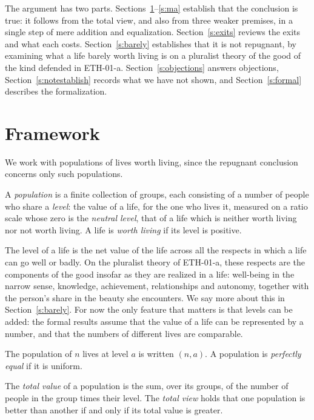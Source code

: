 \documentclass{situationist-preprint}
\begin{document}
The argument has two parts. Sections~\ref{s:framework}--\ref{s:ma} establish that the conclusion is true: it follows from the total view, and also from three weaker premises, in a single step of mere addition and equalization. Section~\ref{s:exits} reviews the exits and what each costs. Section~\ref{s:barely} establishes that it is not repugnant, by examining what a life barely worth living is on a pluralist theory of the good of the kind defended in ETH-01-a. Section~\ref{s:objections} answers objections, Section~\ref{s:notestablish} records what we have not shown, and Section~\ref{s:formal} describes the formalization.

\section{Framework}\label{s:framework}

We work with populations of lives worth living, since the repugnant conclusion concerns only such populations.

\begin{definition}[Population]\label{d:pop}
A \emph{population} is a finite collection of groups, each consisting of a number of people who share a \emph{level}: the value of a life, for the one who lives it, measured on a ratio scale whose zero is the \emph{neutral level}, that of a life which is neither worth living nor not worth living. A life is \emph{worth living} if its level is positive.
\end{definition}

The level of a life is the net value of the life across all the respects in which a life can go well or badly. On the pluralist theory of ETH-01-a, these respects are the components of the good insofar as they are realized in a life: well-being in the narrow sense, knowledge, achievement, relationships and autonomy, together with the person's share in the beauty she encounters. We say more about this in Section~\ref{s:barely}. For now the only feature that matters is that levels can be added: the formal results assume that the value of a life can be represented by a number, and that the numbers of different lives are comparable.

\begin{definition}\label{d:uniform}
The population of $n$ lives at level $a$ is written $(n,a)$. A population is \emph{perfectly equal} if it is uniform.
\end{definition}

\begin{definition}\label{d:total}
The \emph{total value} of a population is the sum, over its groups, of the number of people in the group times their level. The \emph{total view} holds that one population is better than another if and only if its total value is greater.
\end{definition}
\end{document}
